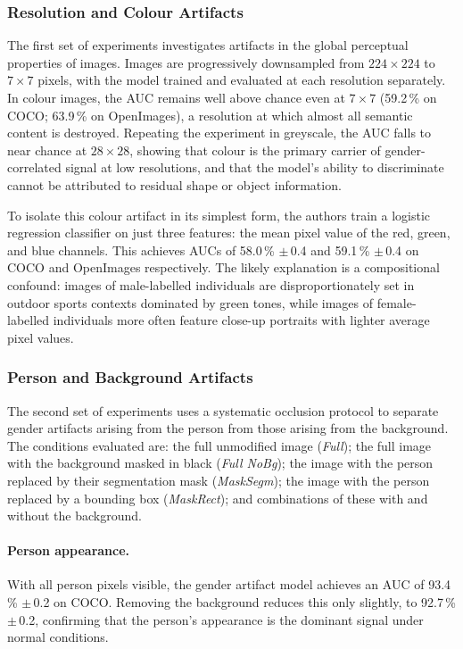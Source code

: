 \subsubsection*{Resolution and Colour Artifacts}

The first set of experiments investigates artifacts in the global perceptual properties of
images.  Images are progressively downsampled from $224\!\times\!224$ to $7\!\times\!7$
pixels, with the model trained and evaluated at each resolution separately.  In colour
images, the AUC remains well above chance even at $7\!\times\!7$ (59.2\,\% on COCO;
63.9\,\% on OpenImages), a resolution at which almost all semantic content is destroyed.
Repeating the experiment in greyscale, the AUC falls to near chance at $28\!\times\!28$,
showing that colour is the primary carrier of gender-correlated signal at low resolutions,
and that the model's ability to discriminate cannot be attributed to residual shape or object
information.

To isolate this colour artifact in its simplest form, the authors train a logistic regression
classifier on just three features: the mean pixel value of the red, green, and blue channels.
This achieves AUCs of 58.0\,\% $\pm$\,0.4 and 59.1\,\% $\pm$\,0.4 on COCO and OpenImages
respectively.  The likely explanation is a compositional confound: images of male-labelled
individuals are disproportionately set in outdoor sports contexts dominated by green tones,
while images of female-labelled individuals more often feature close-up portraits with
lighter average pixel values.

\subsubsection*{Person and Background Artifacts}

The second set of experiments uses a systematic occlusion protocol to separate gender
artifacts arising from the person from those arising from the background.  The conditions
evaluated are: the full unmodified image (\emph{Full}); the full image with the background
masked in black (\emph{Full NoBg}); the image with the person replaced by their segmentation
mask (\emph{MaskSegm}); the image with the person replaced by a bounding box
(\emph{MaskRect}); and combinations of these with and without the background.

\paragraph{Person appearance.}
With all person pixels visible, the gender artifact model achieves an AUC of 93.4\,\%
$\pm$\,0.2 on COCO.  Removing the background reduces this only slightly, to 92.7\,\%
$\pm$\,0.2, confirming that the person's appearance is the dominant signal under normal
conditions.

